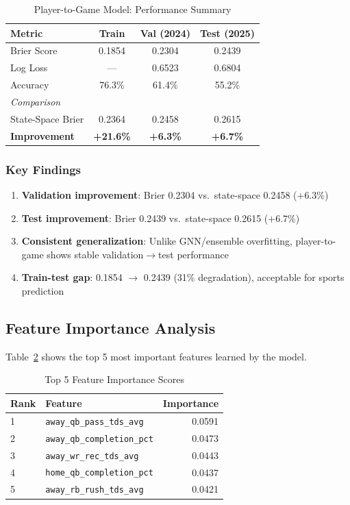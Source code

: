 \begin{table}[h]
\centering
\caption{Player-to-Game Model: Performance Summary}
\label{tab:player-to-game-results}
\begin{tabular}{lccc}
\toprule
\textbf{Metric} & \textbf{Train} & \textbf{Val (2024)} & \textbf{Test (2025)} \\
\midrule
Brier Score & 0.1854 & 0.2304 & 0.2439 \\
Log Loss & --- & 0.6523 & 0.6804 \\
Accuracy & 76.3\% & 61.4\% & 55.2\% \\
\midrule
\textit{Comparison} & & & \\
State-Space Brier & 0.2364 & 0.2458 & 0.2615 \\
\textbf{Improvement} & \textbf{+21.6\%} & \textbf{+6.3\%} & \textbf{+6.7\%} \\
\bottomrule
\end{tabular}
\end{table}

\subsubsection{Key Findings}

\begin{enumerate}
    \item \textbf{Validation improvement}: Brier 0.2304 vs.\ state-space 0.2458 ($+6.3\%$)
    \item \textbf{Test improvement}: Brier 0.2439 vs.\ state-space 0.2615 ($+6.7\%$)
    \item \textbf{Consistent generalization}: Unlike GNN/ensemble overfitting, player-to-game shows stable validation$\to$test performance
    \item \textbf{Train-test gap}: 0.1854 $\to$ 0.2439 (31\% degradation), acceptable for sports prediction
\end{enumerate}

\subsection{Feature Importance Analysis}

Table~\ref{tab:feature-importance} shows the top 5 most important features learned by the model.

\begin{table}[h]
\centering
\caption{Top 5 Feature Importance Scores}
\label{tab:feature-importance}
\begin{tabular}{llr}
\toprule
\textbf{Rank} & \textbf{Feature} & \textbf{Importance} \\
\midrule
1 & \texttt{away\_qb\_pass\_tds\_avg} & 0.0591 \\
2 & \texttt{away\_qb\_completion\_pct} & 0.0473 \\
3 & \texttt{away\_wr\_rec\_tds\_avg} & 0.0443 \\
4 & \texttt{home\_qb\_completion\_pct} & 0.0437 \\
5 & \texttt{away\_rb\_rush\_tds\_avg} & 0.0421 \\
\bottomrule
\end{tabular}
\end{table}

